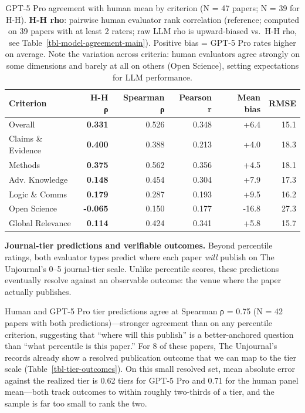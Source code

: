 \documentclass[
  11pt,
  letterpaper,
]{article}
\begin{document}
\begin{table}

\caption{\label{tbl-criteria-agreement-main}GPT-5 Pro agreement with
human mean by criterion (N = 47 papers; N = 39 for H-H). \textbf{H-H
rho}: pairwise human evaluator rank correlation (reference; computed on
39 papers with at least 2 raters; raw LLM rho is upward-biased vs.~H-H
rho, see Table~\ref{tbl-model-agreement-main}). Positive bias = GPT-5
Pro rates higher on average. Note the variation across criteria: human
evaluators agree strongly on some dimensions and barely at all on others
(Open Science), setting expectations for LLM performance.}

\begin{tabular}{l|>{}r|r|r|r|r}
\hline
Criterion & H-H ρ & Spearman ρ & Pearson r & Mean bias & RMSE\\
\hline
Overall & \textbf{0.331} & 0.526 & 0.348 & +6.4 & 15.1\\
\hline
Claims \& Evidence & \textbf{0.400} & 0.388 & 0.213 & +4.0 & 18.3\\
\hline
Methods & \textbf{0.375} & 0.562 & 0.356 & +4.5 & 18.1\\
\hline
Adv. Knowledge & \textbf{0.148} & 0.454 & 0.304 & +7.9 & 17.3\\
\hline
Logic \& Comms & \textbf{0.179} & 0.287 & 0.193 & +9.5 & 16.2\\
\hline
Open Science & \textbf{-0.065} & 0.150 & 0.177 & -16.8 & 27.3\\
\hline
Global Relevance & \textbf{0.114} & 0.424 & 0.341 & +5.8 & 15.7\\
\hline
\end{tabular}

\end{table}%

\textbf{Journal-tier predictions and verifiable outcomes.} Beyond
percentile ratings, both evaluator types predict where each paper
\emph{will} publish on The Unjournal's 0--5 journal-tier scale. Unlike
percentile scores, these predictions eventually resolve against an
observable outcome: the venue where the paper actually publishes.

Human and GPT-5 Pro tier predictions agree at Spearman ρ = 0.75 (N = 42
papers with both predictions)---stronger agreement than on any
percentile criterion, suggesting that ``where will this publish'' is a
better-anchored question than ``what percentile is this paper.'' For 8
of these papers, The Unjournal's records already show a resolved
publication outcome that we can map to the tier scale
(Table~\ref{tbl-tier-outcomes}). On this small resolved set, mean
absolute error against the realized tier is 0.62 tiers for GPT-5 Pro and
0.71 for the human panel mean---both track outcomes to within roughly
two-thirds of a tier, and the sample is far too small to rank the two.
\end{document}
